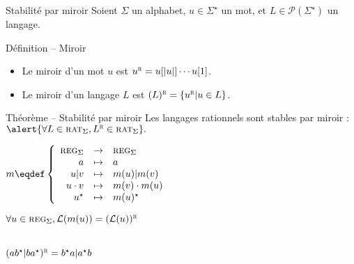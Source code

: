 
\begingroup

\begin{frame}{Stabilité par miroir}
  \small
  \vspace{-1mm}
  Soient $\Sigma$ un alphabet, $u \in \Sigma^\star$ un mot, et $L \in \mathscr{P}(\Sigma^\star)$ un langage.

  \begin{block}{Définition -- Miroir}
    \begin{itemize}
    \item \vspace{-1mm}Le miroir d'un mot $u$ est $u^{\textsc{r}} = u[|u|]\cdots u[1]$.
    \item \vspace{-1mm}Le miroir d'un langage $L$ est $(L)^{\textsc{r}} = \{u^{\textsc{r}} | u \in L\}$.
    \end{itemize}
  \end{block}
  
  \vspace{-2mm}
  \begin{alertblock}{Théorème -- Stabilité par miroir}
    Les langages rationnels sont stables par miroir : $\alert{\forall L \in \textsc{rat}_\Sigma, L^{\textsc{r}} \in \textsc{rat}_\Sigma}.$
  \end{alertblock}

  \begin{minipage}[t]{.5\textwidth}

    \vspace{3mm}
    $m \eqdef \left\{\begin{array}{rcl}
      \textsc{reg}_\Sigma & \rightarrow & \textsc{reg}_\Sigma\\
      a & \mapsto & a\\
      u | v & \mapsto & m(u) | m(v)\\
      u \cdot v & \mapsto & m(v) \cdot m(u)\\
      u^\star & \mapsto & m(u)^\star\\
      \end{array}\right.$

    $\forall u \in \textsc{reg}_\Sigma, \mathcal{L}(m(u)) = (\mathcal{L}(u))^{\textsc{r}}$
    
    \vspace{3mm}\\ $(ab^\star | ba^\star)^{\textsc{r}} = b^\star a | a^\star b$
      

\end{minipage}
\end{frame}
